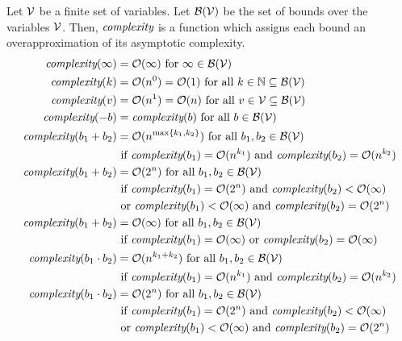 \begin{definition}
  \allowdisplaybreaks
  Let $\mathcal{V}$ be a finite set of variables.
  Let $\mathcal{B}(\mathcal{V})$ be the set of bounds over the variables $\mathcal{V}$.
  Then, $\emph{complexity}$ is a function which assigns each bound an overapproximation of its asymptotic complexity.
  \begin{align*}
    \complexity(\infty) &= \landau(\infty) \text{ for } \infty \in \BoundSet(\VSet) \\
    \complexity(k) &= \landau(n^0) = \landau(1) \text{ for all } k \in \mathbb{N} \subseteq \BoundSet(\VSet) \\
    \complexity(v) &= \landau(n^1) = \landau(n) \text{ for all } v \in \VSet \subseteq \BoundSet(\VSet) \\
    \complexity(-b) &= \complexity(b) \text{ for all } b \in \BoundSet(\VSet) \\
    \complexity(b_1 + b_2) &= \landau(n^{\maximum{k_1, k_2}}) \text{ for all } b_1, b_2 \in \BoundSet(\VSet) \\
    & \text{ if } \complexity(b_1)=\landau(n^{k_1}) \text{ and } \complexity(b_2)=\landau(n^{k_2}) \\
    \complexity(b_1 + b_2) &= \landau(2^n) \text{ for all } b_1, b_2 \in \BoundSet(\VSet) \\
    & \text{ if } \complexity(b_1)=\landau(2^n) \text{ and } \complexity(b_2)<\landau(\infty) \\
    & \text{ or } \complexity(b_1)<\landau(\infty) \text{ and } \complexity(b_2)=\landau(2^n) \\
    \complexity(b_1 + b_2) &= \landau(\infty) \text{ for all } b_1, b_2 \in \BoundSet(\VSet) \\
    & \text{ if } \complexity(b_1)=\landau(\infty) \text{ or } \complexity(b_2)=\landau(\infty) \\
    \complexity(b_1 \cdot b_2) &= \landau(n^{k_1 + k_2}) \text{ for all } b_1, b_2 \in \BoundSet(\VSet) \\
    & \text{ if } \complexity(b_1)=\landau(n^{k_1}) \text{ and } \complexity(b_2)=\landau(n^{k_2}) \\
    \complexity(b_1 \cdot b_2) &= \landau(2^n) \text{ for all } b_1, b_2 \in \BoundSet(\VSet) \\
    & \text{ if } \complexity(b_1)=\landau(2^n) \text{ and } \complexity(b_2)<\landau(\infty) \\
    & \text{ or } \complexity(b_1)<\landau(\infty) \text{ and } \complexity(b_2)=\landau(2^n) \\

\end{align*}
\end{definition}
